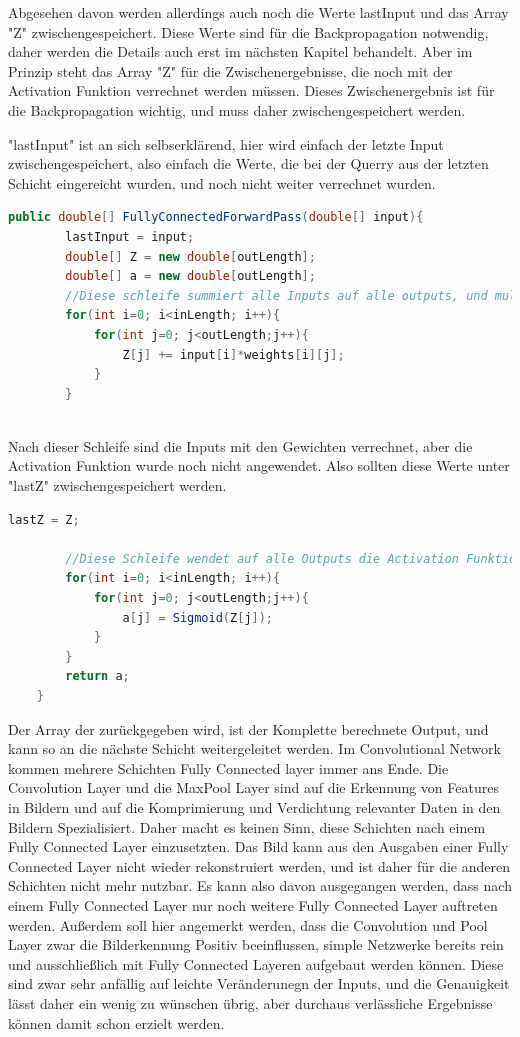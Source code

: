 \documentclass[12pt]{article}
\begin{document}
Abgesehen davon werden allerdings auch noch die Werte lastInput und das Array "Z" zwischengespeichert. Diese Werte sind für die Backpropagation notwendig, daher werden die Details auch erst im nächsten Kapitel behandelt. Aber im Prinzip steht das Array "Z" für die Zwischenergebnisse, die noch mit der Activation Funktion verrechnet werden müssen. Dieses Zwischenergebnis ist für die Backpropagation wichtig, und muss daher zwischengespeichert werden.

"lastInput" ist an sich selbserklärend, hier wird einfach der letzte Input zwischengespeichert, also einfach die Werte, die bei der Querry aus der letzten Schicht eingereicht wurden, und noch nicht weiter verrechnet wurden.

\begin{lstlisting}[language=Java]
    public double[] FullyConnectedForwardPass(double[] input){
        lastInput = input;
        double[] Z = new double[outLength];
        double[] a = new double[outLength];
        //Diese schleife summiert alle Inputs auf alle outputs, und multipliziert die Inputs mit ihren jeweiligen gewichten aus der weights-Matrix
        for(int i=0; i<inLength; i++){
            for(int j=0; j<outLength;j++){
                Z[j] += input[i]*weights[i][j];
            }
        }
        
\end{lstlisting}
Nach dieser Schleife sind die Inputs mit den Gewichten verrechnet, aber die Activation Funktion wurde noch nicht angewendet. Also sollten diese Werte unter "lastZ" zwischengespeichert werden.
\begin{lstlisting}[language=Java] 
        lastZ = Z;
		
		//Diese Schleife wendet auf alle Outputs die Activation Funktion an, in diesem Falle die Sigmoid Funktion
        for(int i=0; i<inLength; i++){
            for(int j=0; j<outLength;j++){
                a[j] = Sigmoid(Z[j]);
            }
        }
        return a;
    }
\end{lstlisting} 

Der Array der zurückgegeben wird, ist der Komplette berechnete Output, und kann so an die nächste Schicht weitergeleitet werden. Im Convolutional Network kommen mehrere Schichten Fully Connected layer immer ans Ende. Die Convolution Layer und die MaxPool Layer sind auf die Erkennung von Features in Bildern und auf die Komprimierung und Verdichtung relevanter Daten in den Bildern Spezialisiert. Daher macht es keinen Sinn, diese Schichten nach einem Fully Connected Layer einzusetzten. Das Bild kann aus den Ausgaben einer Fully Connected Layer nicht wieder rekonstruiert werden, und ist daher für die anderen Schichten nicht mehr nutzbar. Es kann also davon ausgegangen werden, dass nach einem Fully Connected Layer nur noch weitere Fully Connected Layer auftreten werden. 
Außerdem soll hier angemerkt werden, dass die Convolution und Pool Layer zwar die Bilderkennung Positiv beeinflussen, simple Netzwerke bereits rein und ausschließlich mit Fully Connected Layeren aufgebaut werden können. Diese sind zwar sehr anfällig auf leichte Veränderunegn der Inputs, und die Genauigkeit lässt daher ein wenig zu wünschen übrig, aber durchaus verlässliche Ergebnisse können damit schon erzielt werden.
\end{document}
